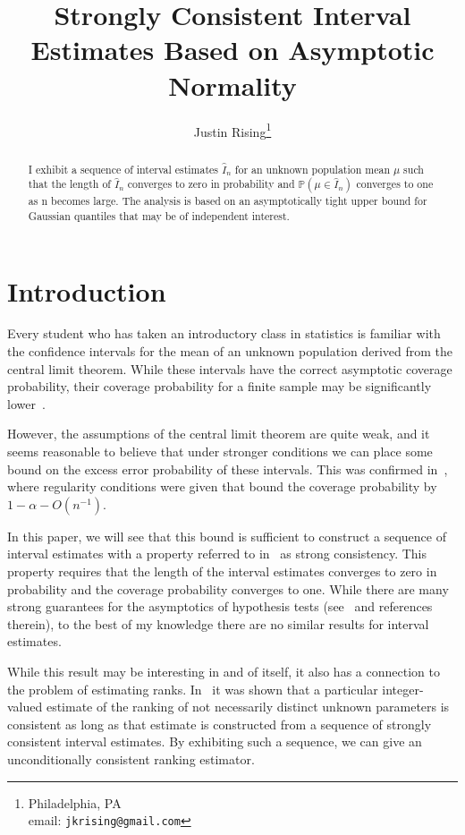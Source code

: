 \documentclass[12pt]{article}
\title{Strongly Consistent Interval Estimates Based on Asymptotic Normality}
\author{Justin Rising\thanks{Philadelphia, PA\\email: \texttt{jkrising@gmail.com}}}
\newcommand{\prob}[1]{\mathbb{P}(#1)}
\numberwithin{theorem}{section}
\begin{document}
\maketitle

\begin{abstract}
I exhibit a sequence of interval estimates $\hat{I}_n$ for an unknown population mean $\mu$ such that the length of $\hat{I}_n$ converges to zero in probability and $\prob{\mu \in \hat{I}_n}$ converges to one as n becomes large.  The analysis is based on an asymptotically tight upper bound for Gaussian quantiles that may be of independent interest.
\end{abstract}

\section{Introduction}
\label{sec_intro}

Every student who has taken an introductory class in statistics is familiar with the confidence intervals for the mean of an unknown population derived from the central limit theorem.  While these intervals have the correct asymptotic coverage probability, their coverage probability for a finite sample may be significantly lower~\citep{brown2001binomInt}.

However, the assumptions of the central limit theorem are quite weak, and it seems reasonable to believe that under stronger conditions we can place some bound on the excess error probability of these intervals.  This was confirmed in~\cite{hall1995coverage}, where regularity conditions were given that bound the coverage probability by $1 - \alpha - O(n^{-1})$.

In this paper, we will see that this bound is sufficient to construct a sequence of interval estimates with a property referred to in~\cite{rising2023orderPersp} as strong consistency.  This property requires that the length of the interval estimates converges to zero in probability and the coverage probability converges to one.  While there are many strong guarantees for the asymptotics of hypothesis tests (see~\cite{ermakov2017testing} and references therein), to the best of my knowledge there are no similar results for interval estimates.

While this result may be interesting in and of itself, it also has a connection to the problem of estimating ranks.  In~\cite{rising2023orderPersp} it was shown that a particular integer-valued estimate of the ranking of not necessarily distinct unknown parameters is consistent as long as that estimate is constructed from a sequence of strongly consistent interval estimates.  By exhibiting such a sequence, we can give an unconditionally consistent ranking estimator.
\end{document}
